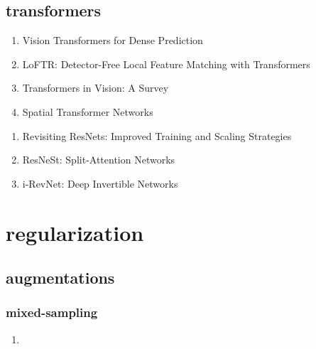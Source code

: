 \documentclass[acmlarge]{acmart}
\begin{document}
	\subsection{transformers}
	\begin{enumerate}
		\item Vision Transformers for Dense Prediction \cite{Ranftl2021VisionTF} 

		\item LoFTR: Detector-Free Local Feature Matching with Transformers \cite{Sun2021LoFTRDL} 

		\item Transformers in Vision: A Survey \cite{Khan2022TransformersIV} 

		\item Spatial Transformer Networks \cite{Jaderberg2015SpatialTN} 

	\end{enumerate}
\begin{enumerate}
	\item Revisiting ResNets: Improved Training and Scaling Strategies \cite{Bello2021RevisitingRI} 

	\item ResNeSt: Split-Attention Networks \cite{Zhang2020ResNeStSN} 

	\item i-RevNet: Deep Invertible Networks \cite{Jacobsen2018iRevNetDI} 

\end{enumerate}
\section{regularization}
	\subsection{augmentations}
		\subsubsection{mixed-sampling}
		\begin{enumerate}
			\item
		\end{enumerate}
\end{document}
